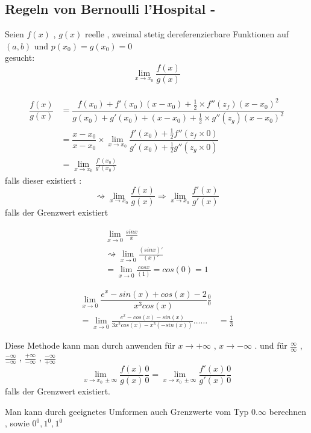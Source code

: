 \subsection{Regeln von Bernoulli l'Hospital -}
Seien $ f(x) $ , $g(x)$ reelle , zweimal stetig dereferenzierbare Funktionen auf $(a,b)$ und $p(x_0) = g(x_0) = 0$\\
gesucht: $$\lim_{x \to x_0}{\frac{f(x)}{g(x)}}$$\\
\begin{align*}
\dfrac{f(x)}{g(x)} &=
\dfrac{f(x_0) + f'(x_0)(x - x_0)+ \frac{1}{2} \times f''(z_f)(x-x_0)^2}
{g(x_0) + g'(x_0) + (x - x_0) + \frac{1}{2} \times g''(z_g)(x - x_0)^2 }\\
&= \dfrac{x - x_0}{x - x_0} \times 
\lim_{x \to x_0}
{ \dfrac 
{f'(x_0) + \frac{1}{2} f''(z_f \times 0)}
{g'(x_0) + \frac{1}{2} g''(z_g \times 0)} 
} \\
&= \lim_{x \to x_0}{\frac{f'(x_0)}{g'(x_0)}} 
\end{align*}
falls dieser existiert :
\[\rightsquigarrow \lim_{x \to x_0}{\frac{f(x)}{g(x)}} \Rightarrow
\lim_{x \to x_0}{\frac{f'(x)}{g'(x)}} \]  falls der Grenzwert existiert 
\begin{example}
\begin{gather*}
\lim_{x \to 0}{\frac{sin x}{x}} \\
\rightsquigarrow \lim_{x \to 0}{\frac{(sin x)'}{(x)'}}\\
= \lim_{x \to 0}{\frac{cos x}{(1)}} = cos(0) = 1
\end{gather*}
\end{example}
\begin{example}
\begin{align*}
\lim_{x \to 0}{\dfrac{e^x - sin(x) + cos(x)-2}{x^3cos(x)}} 
\frac{0}{0} \\
= \lim_{x \to 0 }{\frac{e^x - cos(x) - sin(x)}{3x^2 cos(x)-x^3(-sin(x))}} \dots \dots &= \frac{1}{3}
\end{align*}
\end{example}
\begin{remark}
Diese Methode kann man durch anwenden für $x \to + \infty$ , $x \to - \infty$ . und für $\frac{\infty}{\infty}$ , $\frac{-\infty}{-\infty}$ , $\frac{+\infty}{-\infty}$ , $\frac{-\infty}{+\infty}$\\
\[ \lim_{x \to x_0 \ \pm \infty}{\frac{f(x)}{g(x)}}\frac{0}{0}= 
\lim_{x \to x_0 \ \pm \infty}{\frac{f'(x)}{g'(x)}}\frac{0}{0} \]
falls der Grenzwert existiert. 
\end{remark}
\begin{remark}
Man kann durch geeignetes Umformen auch Grenzwerte vom Typ $0.\infty $ berechnen , sowie $0^0 , 1^0 , 1^0$
\end{remark}
 
